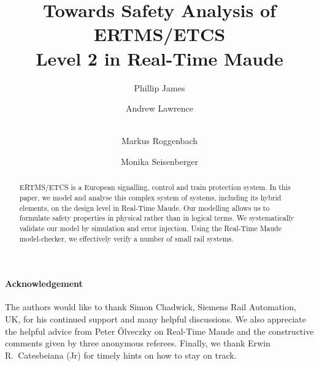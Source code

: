 \documentclass[runningheads,a4paper]{llncs}
\begin{document}
\mainmatter 

\title{Towards Safety Analysis of ERTMS/ETCS \\ Level 2 in Real-Time
  Maude}


\author{Phillip James \and Andrew Lawrence  \and \\ 
Markus Roggenbach \and  Monika Seisenberger}
%


\maketitle

\begin{abstract}
ERTMS/ETCS is a European signalling, control and train protection
system. In this paper, we model and analyse this complex system of
systems, including its hybrid elements, on the design level in
Real-Time Maude. Our modelling allows us to formulate safety
properties in physical rather than in logical terms. %
We systematically validate our model by simulation and error
injection. Using the Real-Time Maude model-checker, we effectively
verify a number of small rail systems.
\end{abstract}


















\paragraph{Acknowledgement} 
The authors would like to thank Simon Chadwick, Siemens Rail
Automation, UK, for his continued support and many helpful
discussions. We also appreciate the helpful advice from  Peter \"Olveczky
on Real-Time Maude and the constructive comments given by three anonymous referees. Finally, we thank Erwin R.\ Catesbeiana (Jr) for timely hints on how to
stay on track.



\end{document}
